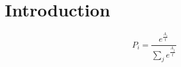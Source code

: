 \thispagestyle{empty}
\pagestyle{empty}
\section{Introduction}


\begin{equation}\label{eq:prob}
P_{i} = \frac{e^{\frac{A_i}{t}}}{\sum_{j}e^{\frac{A_j}{t}}}
\end{equation}

